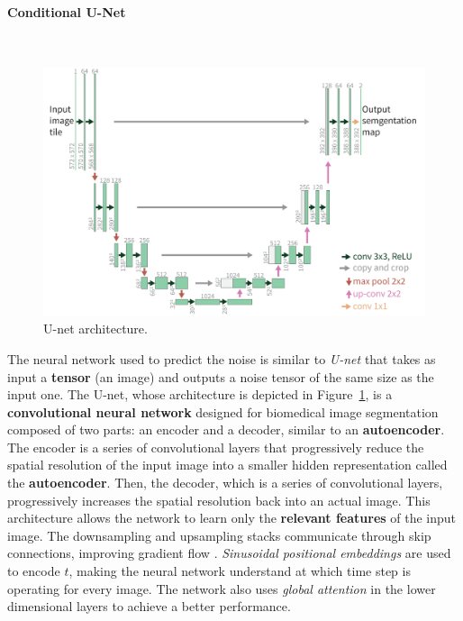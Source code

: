 \documentclass[preprint]{elsarticle}
\begin{document}
\paragraph{Conditional U-Net}\mbox{}\\

\begin{figure}[t]
	\centering
    \includegraphics[scale=0.85]{img/svg/UNET.png}
	\caption{U-net architecture.}\label{fig:unet}
\end{figure}



The neural network used to predict the noise is similar to \emph{U-net} \cite{ronneberger2015unet} that takes as input a 
\textbf{tensor} (an image) and outputs a noise tensor
of the same size as the input one.
The U-net, whose architecture is depicted in Figure~\ref{fig:unet}, is a \textbf{convolutional neural network} designed for biomedical image segmentation
composed of two parts: an encoder and a decoder, similar to an \textbf{autoencoder}.
The encoder is a series of convolutional layers that progressively reduce the spatial resolution of the input image 
into a smaller hidden representation called the \textbf{autoencoder}.
Then, the decoder, which is a series of convolutional layers, progressively increases the spatial resolution back into an actual image.
This architecture allows the network to learn only the \textbf{relevant features} of the input image.
The downsampling and upsampling stacks communicate through skip connections, improving gradient flow \cite{he2015deep}.
\emph{Sinusoidal positional embeddings} are used to encode $t$, 
making the neural network understand at which time step is operating for every image.
The network also uses \emph{global attention} in the lower dimensional layers to achieve a better performance.
\end{document}

